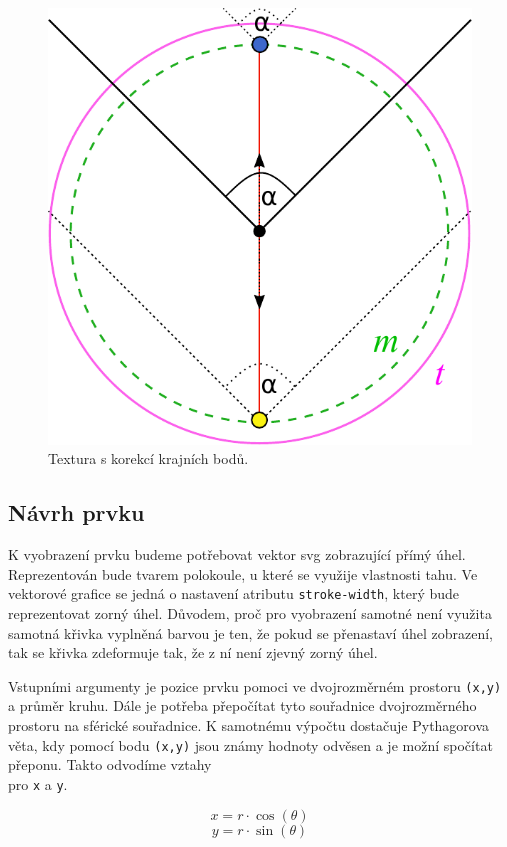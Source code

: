 \begin{figure}[h]
	\label{img:field_vision_implementation}
	\centering
	\includegraphics[scale=1.0,angle=0,width=0.45\linewidth]{obrazky-figures/field_vision_implementation}
	\caption{Textura s korekcí krajních bodů.}
\end{figure}


\newpage

\subsection{Návrh prvku}
K vyobrazení prvku budeme potřebovat vektor svg zobrazující přímý úhel. Reprezentován bude tvarem polokoule, u které se využije vlastnosti tahu. Ve vektorové grafice se jedná o nastavení atributu \texttt{stroke-width}, který bude reprezentovat zorný úhel. Důvodem, proč pro vyobrazení samotné není využita samotná křivka vyplněná barvou je ten, že pokud se přenastaví úhel zobrazení, tak se křivka zdeformuje tak, že z ní není zjevný zorný úhel.

Vstupními argumenty je pozice prvku pomoci ve dvojrozměrném prostoru \texttt{(x,y)} a průměr kruhu. Dále je potřeba přepočítat tyto souřadnice dvojrozměrného prostoru na sférické souřadnice. K samotnému výpočtu dostačuje Pythagorova věta, kdy pomocí bodu \texttt{(x,y)} jsou známy hodnoty odvěsen a je možní spočítat přeponu. Takto odvodíme vztahy \\pro \texttt{x} a \texttt{y}.


 $$ x = r\cdot\cos(\theta) $$ 
 $$ y = r\cdot\sin(\theta) $$  






\newpage


